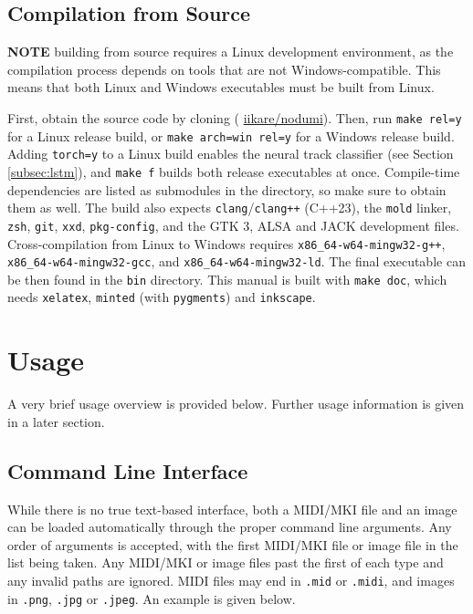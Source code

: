 \documentclass[english]{article}
\providecommand{\mi}[1]{\texttt{#1}}
\begin{document}
\subsection{Compilation from Source}

\textbf{NOTE} \textendash{} building from source requires a Linux development environment, as the compilation process depends on 
tools that are not Windows-compatible. This means that both Linux and Windows executables must be built from Linux.

\vspace{1em}

First, obtain the source code by cloning 
\textcolor{lcol}{(\raisebox{-0.1\height}{\faGithub} \href{https://github.com/iikare/nodumi}{iikare/nodumi})}.
Then, run \mi{make rel=y} for a Linux release build, or \mi{make arch=win rel=y} for a Windows release build.
Adding \mi{torch=y} to a Linux build enables the neural track classifier (see Section 
\textcolor{lcol}{\hyperref[subsec:lstm]{\ref{subsec:lstm}}}), and \mi{make f} builds both release executables at once.
Compile-time dependencies are listed as submodules in the directory, so make sure to obtain them as well.
The build also expects \mi{clang}/\mi{clang++} (C++23), the \mi{mold} linker, \mi{zsh}, \mi{git}, \mi{xxd},
\mi{pkg-config}, and the GTK 3, ALSA and JACK development files. Cross-compilation
from Linux to Windows requires 
\mi{x86_64-w64-mingw32-g++},
\mi{x86_64-w64-mingw32-gcc}, and
\mi{x86_64-w64-mingw32-ld}. The final executable can be then found in the \mi{bin} directory.
This manual is built with \mi{make doc}, which needs \mi{xelatex}, \mi{minted} (with \mi{pygments}) and \mi{inkscape}.

\section{Usage}

A very brief usage overview is provided below. Further usage information is given in a later section.

\subsection{Command Line Interface}

While there is no true text-based interface, both a MIDI/MKI file and an image can be loaded automatically through
the proper command line arguments. Any order of arguments is accepted, with the first MIDI/MKI file or image file in the list
being taken. Any MIDI/MKI or image files past the first of each type and any invalid paths are ignored. MIDI files may end in
\mi{.mid} or \mi{.midi}, and images in \mi{.png}, \mi{.jpg} or \mi{.jpeg}. An example is given below.
\end{document}
